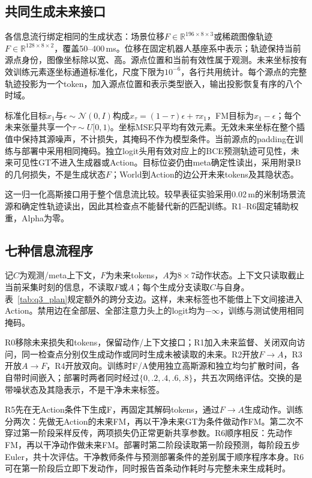 \subsection{共同生成未来接口}
\label{app:generated_future}
各信息流行绑定相同的生成状态：场景位移$F\in\mathbb R^{196\times8\times3}$或稀疏图像轨迹$F\in\mathbb R^{128\times8\times2}$，覆盖50--400\,ms。位移在固定机器人基座系中表示；轨迹保持当前源点身份，图像坐标除以宽、高。源点位置和当前有效性属于观测。未来坐标按有效训练元素逐坐标通道标准化，尺度下限为$10^{-6}$，各行共用统计。每个源点的完整轨迹投影为一个token，加入源点位置和表示类型嵌入，输出投影恢复有序的八个时域。

标准化目标$x_1$与$\epsilon\sim\mathcal N(0,I)$构成$x_\tau=(1-\tau)\epsilon+\tau x_1$，FM目标为$x_1-\epsilon$；每个未来张量共享一个$\tau\sim U[0,1)$。坐标MSE只平均有效元素。无效未来坐标在整个插值中保持其源噪声，不计损失，其掩码不作为模型条件。当前源点的padding在训练与部署中采用相同掩码。独立logit头用有效对应上的BCE预测轨迹可见性，未来可见性GT不进入生成器或Action。目标位姿仍由meta确定性读出，采用附录B的几何损失，不是生成状态$F$；World到Action的边公开未来tokens及其隐状态。

这一归一化高斯接口用于整个信息流比较。较早表征实验采用0.02\,m的米制场景流源和确定性轨迹读出，因此其检查点不能替代新的匹配训练。R1--R6固定辅助权重，Alpha为零。

\subsection{七种信息流程序}

记$C$为观测/meta上下文，$F$为未来tokens，$A$为$8\times7$动作状态。上下文只读取截止当前采集时刻的信息，不读取$F$或$A$；每个生成分支读取$C$与自身。表~\ref{tab:q3_plan}规定额外的跨分支边。这样，未来标签也不能借上下文间接进入Action。禁用边在全部层、全部注意力头上的logit均为$-\infty$，训练与测试使用相同掩码。

R0移除未来损失和tokens，保留动作/上下文接口；R1加入未来监督、关闭双向访问，同一检查点分别仅生成动作或同时生成未被读取的未来。R2开放$F\to A$，R3开放$A\to F$，R4开放双向。训练时F/A使用独立高斯源和独立均匀扩散时间，各自带时间嵌入；部署时两者同时经过$\{0,.2,.4,.6,.8\}$，共五次网络评估。交换的是带噪状态及其隐表示，不是干净未来标签。

R5先在无Action条件下生成F，再固定其解码tokens，通过$F\to A$生成动作。训练分两次：先做无Action的未来FM，再以干净未来GT为条件做动作FM。第二次不穿过第一阶段采样反传，两项损失仍正常更新共享参数。R6顺序相反：先动作FM，再以干净动作做未来FM。部署时第二阶段读取第一阶段预测，每阶段五步Euler，共十次评估。干净教师条件与预测部署条件的差别属于顺序程序本身。R6可在第一阶段后立即下发动作，同时报告首条动作耗时与完整未来生成耗时。

